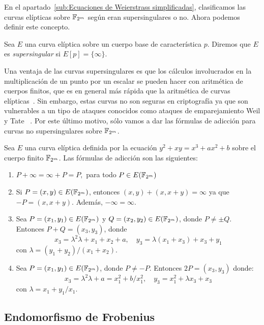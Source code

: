 En el apartado~\ref{sub:Ecuaciones de Weierstrass simplificadas}, clasificamos las curvas elípticas sobre $\mathbb{F}_{2^m}$ según eran supersingulares o no. Ahora podemos definir este concepto.

\begin{definicion}\label{def:supersingular}
	Sea $E$ una curva elíptica sobre un cuerpo base de característica $p$. Diremos que $E$ es \emph{supersingular} si $E[p] = \{\infty\}$.
\end{definicion}

Una ventaja de las curvas supersingulares es que los cálculos involucrados en la multiplicación de un punto por un escalar se pueden hacer con aritmética de cuerpos finitos, que es en general más rápida que la aritmética de curvas elípticas~\cite[cap. 4]{Washington:2008}. Sin embargo, estas curvas no son seguras en criptografía ya que son vulnerables a un tipo de ataques conocidos como ataques de emparejamiento Weil y Tate ~\cite[cap. 4]{Hankerson:2003}. Por este último motivo, sólo vamos a dar las fórmulas de adicción para curvas no supersingulares sobre $\mathbb{F}_{2^m}$.

\begin{formulasadiccion}\label{fa:cuerpos base caracteristica 2}
Sea $E$ una curva elíptica definida por la ecuación $y^2 + x y = x^3 + a x^2 + b$ sobre el cuerpo finito $\mathbb{F}_{2^m}$. Las fórmulas de adicción son las siguientes:
	\begin{enumerate}[label=\alph*)]
	   \item $P + \infty = \infty + P = P,$ para todo $P \in E(\mathbb{F}_{2^m})$
	   \item Si $P = (x, y) \in E(\mathbb{F}_{2^m})$, entonces $(x, y) + (x, x + y) = \infty$ ya que $-P = (x, x + y)$. Además, $- \infty = \infty$.
	   \item Sea $P = (x_1, y_1) \in E(\mathbb{F}_{2^m})$ y $Q = (x_2, y_2) \in E(\mathbb{F}_{2^m})$, donde $P \neq \pm Q$. Entonces $P + Q = (x_3, y_3)$, donde
	   $$
	   x_3 = \lambda^2 \lambda + x_1 + x_2 + a, \quad
	   y_3 = \lambda (x_1 + x_3) + x_3 + y_1
	   $$
	   con $\lambda = (y_1 + y_2)/(x_1 + x_2)$.
	   \item Sea $P = (x_1, y_1) \in E(\mathbb{F}_{2^m})$, donde $P \neq -P$. Entonces $2 P = (x_3, y_3)$ donde:
	   $$
	   x_3 = \lambda^2 \lambda + a = x_1^2 + b/x_1^2, \quad
	   y_3 = x_1^2 + \lambda x_3 + x_3
	   $$
	   con $\lambda = x_1 + y_1/x_1$.
	\end{enumerate}
\end{formulasadiccion}

\subsection{Endomorfismo de Frobenius}
\label{sub:Endomorfismo de Frobenius}

